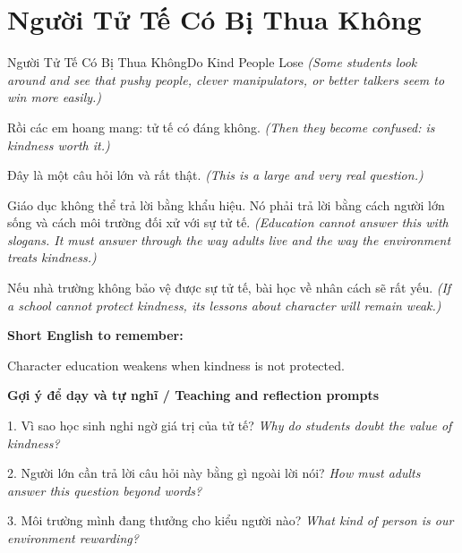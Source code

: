 \section{Người Tử Tế Có Bị Thua Không}
\begin{truyen}{Người Tử Tế Có Bị Thua Không}{Do Kind People Lose}
\textit{(Some students look around and see that pushy people, clever manipulators, or better talkers seem to win more easily.)}

Rồi các em hoang mang: tử tế có đáng không.
\textit{(Then they become confused: is kindness worth it.)}

Đây là một câu hỏi lớn và rất thật.
\textit{(This is a large and very real question.)}

Giáo dục không thể trả lời bằng khẩu hiệu. Nó phải trả lời bằng cách người lớn sống và cách môi trường đối xử với sự tử tế.
\textit{(Education cannot answer this with slogans. It must answer through the way adults live and the way the environment treats kindness.)}

\end{truyen}

\begin{baihoc}
Nếu nhà trường không bảo vệ được sự tử tế, bài học về nhân cách sẽ rất yếu.
\textit{(If a school cannot protect kindness, its lessons about character will remain weak.)}
\end{baihoc}

\begin{ghinhoanh}
\textbf{Short English to remember:}

Character education weakens when kindness is not protected.

\end{ghinhoanh}

\begin{tuhocnhanh}
\textbf{Gợi ý để dạy và tự nghĩ / Teaching and reflection prompts}

1. Vì sao học sinh nghi ngờ giá trị của tử tế? \textit{Why do students doubt the value of kindness?}

2. Người lớn cần trả lời câu hỏi này bằng gì ngoài lời nói? \textit{How must adults answer this question beyond words?}

3. Môi trường mình đang thưởng cho kiểu người nào? \textit{What kind of person is our environment rewarding?}
\end{tuhocnhanh}
\ngancach

